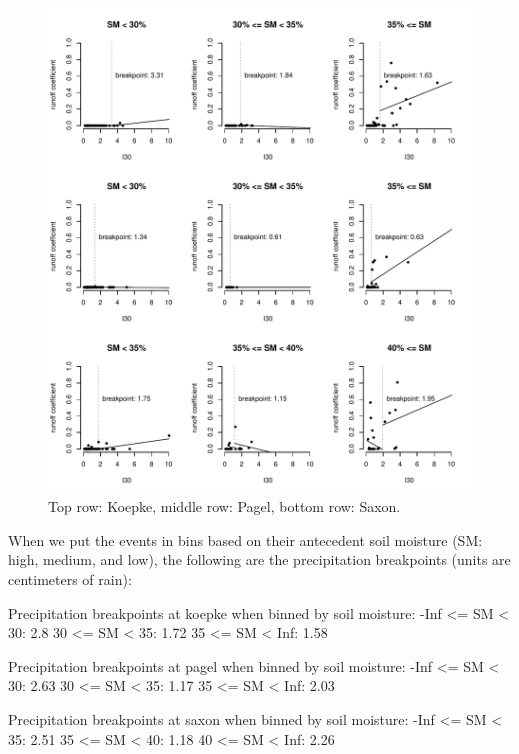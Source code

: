 \documentclass[12pt]{article}
\begin{document}
\begin{figure}
    \begin{center}
\includegraphics{runoff-I30_binned}
    \end{center}
    \caption{Top row: Koepke, middle row: Pagel, bottom row: Saxon.\label{I30_binned}}
\end{figure}


When we put the events in bins based on their antecedent soil moisture (SM: high, medium, and low), the following are the precipitation breakpoints (units are centimeters of rain):\\

\begin{Schunk}
\begin{Soutput}
Precipitation breakpoints at koepke when binned by soil moisture:
-Inf <= SM < 30: 2.8
30 <= SM < 35: 1.72
35 <= SM < Inf: 1.58

Precipitation breakpoints at pagel when binned by soil moisture:
-Inf <= SM < 30: 2.63
30 <= SM < 35: 1.17
35 <= SM < Inf: 2.03

Precipitation breakpoints at saxon when binned by soil moisture:
-Inf <= SM < 35: 2.51
35 <= SM < 40: 1.18
40 <= SM < Inf: 2.26
\end{Soutput}
\end{Schunk}
\end{document}
